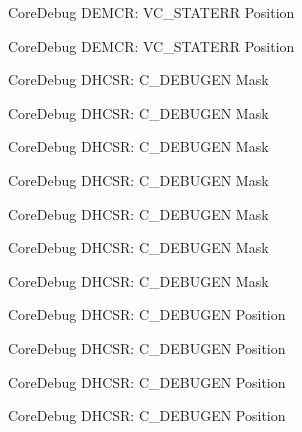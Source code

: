 \begin{DoxyRefList}
\label{deprecated__deprecated000423}%
%
Core\+Debug D\+E\+M\+CR\+: V\+C\+\_\+\+S\+T\+A\+T\+E\+RR Position 

\label{deprecated__deprecated000512}%
%
Core\+Debug D\+E\+M\+CR\+: V\+C\+\_\+\+S\+T\+A\+T\+E\+RR Position  
\item[Member \mbox{\hyperlink{group__CMSIS__CoreDebug_gab815c741a4fc2a61988cd2fb7594210b}{Core\+Debug\+\_\+\+D\+H\+C\+S\+R\+\_\+\+C\+\_\+\+D\+E\+B\+U\+G\+E\+N\+\_\+\+Msk}} ]\label{deprecated__deprecated000040}%
%
Core\+Debug D\+H\+C\+SR\+: C\+\_\+\+D\+E\+B\+U\+G\+EN Mask 

\label{deprecated__deprecated000128}%
%
Core\+Debug D\+H\+C\+SR\+: C\+\_\+\+D\+E\+B\+U\+G\+EN Mask 

\label{deprecated__deprecated000184}%
%
Core\+Debug D\+H\+C\+SR\+: C\+\_\+\+D\+E\+B\+U\+G\+EN Mask 

\label{deprecated__deprecated000267}%
%
Core\+Debug D\+H\+C\+SR\+: C\+\_\+\+D\+E\+B\+U\+G\+EN Mask 

\label{deprecated__deprecated000326}%
%
Core\+Debug D\+H\+C\+SR\+: C\+\_\+\+D\+E\+B\+U\+G\+EN Mask 

\label{deprecated__deprecated000402}%
%
Core\+Debug D\+H\+C\+SR\+: C\+\_\+\+D\+E\+B\+U\+G\+EN Mask 

\label{deprecated__deprecated000491}%
%
Core\+Debug D\+H\+C\+SR\+: C\+\_\+\+D\+E\+B\+U\+G\+EN Mask  
\item[Member \mbox{\hyperlink{group__CMSIS__CoreDebug_gab557abb5b172b74d2cf44efb9d824e4e}{Core\+Debug\+\_\+\+D\+H\+C\+S\+R\+\_\+\+C\+\_\+\+D\+E\+B\+U\+G\+E\+N\+\_\+\+Pos}} ]\label{deprecated__deprecated000039}%
%
Core\+Debug D\+H\+C\+SR\+: C\+\_\+\+D\+E\+B\+U\+G\+EN Position 

\label{deprecated__deprecated000127}%
%
Core\+Debug D\+H\+C\+SR\+: C\+\_\+\+D\+E\+B\+U\+G\+EN Position 

\label{deprecated__deprecated000183}%
%
Core\+Debug D\+H\+C\+SR\+: C\+\_\+\+D\+E\+B\+U\+G\+EN Position 

\label{deprecated__deprecated000266}%
%
Core\+Debug D\+H\+C\+SR\+: C\+\_\+\+D\+E\+B\+U\+G\+EN Position 


\end{DoxyRefList}
